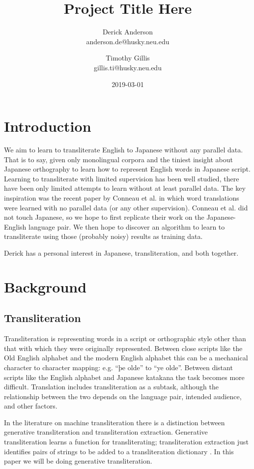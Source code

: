 \documentclass{article}
\title{Project Title Here}
\date{2019-03-01}
\author{Derick Anderson \\ anderson.de@husky.neu.edu
  \and Timothy Gillis \\ gillis.ti@husky.neu.edu }
\begin{document}
\maketitle

\section*{Introduction}

We aim to learn to transliterate English to Japanese
without any parallel data.
That is to say,
given only monolingual corpora
and the tiniest insight about Japanese orthography
to learn how to represent English words in Japanese script.
Learning to transliterate with limited supervision has been well studied,
there have been only limited attempts to learn without at least parallel data.
The key inspiration was the recent paper by
Conneau et al. \cite{Conneau2018WordTW}
in which word translations were learned with no parallel data
(or any other supervision).
Conneau et al. did not touch Japanese,
so we hope to first replicate their work on the Japanese-English language pair.
We then hope to discover an algorithm to learn to transliterate
using those (probably noisy) results as training data.

Derick has a personal interest in Japanese, transliteration, and both together.

\section*{Background}

\subsection*{Transliteration}

Transliteration is representing words
in a script or orthographic style
other than that with which they were originally represented.
Between close scripts like the Old English alphabet and the modern English alphabet
this can be a mechanical character to character mapping:
e.g. ``þe olde'' to ``ye olde''.
Between distant scripts
like the English alphabet and Japanese katakana
the task becomes more difficult.
Translation includes transliteration as a subtask,
although the relationship between the two
depends on the language pair, intended audience, and other factors.

In the literature on machine transliteration there is a distinction
between generative transliteration and transliteration extraction.
Generative transliteration learns a function for transliterating;
transliteration extraction just identifies pairs of strings
to be added to a transliteration dictionary
\cite{Karimi:2011:MTS:1922649.1922654}.
In this paper we will be doing generative transliteration.
\end{document}
